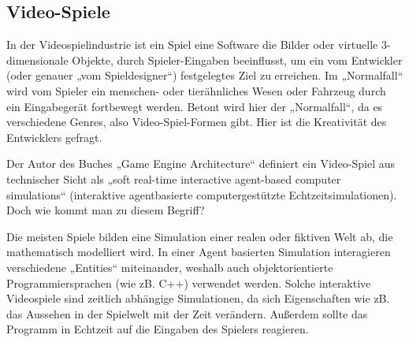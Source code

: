 \subsection{Video-Spiele}

In der Videospielindustrie ist ein Spiel eine Software die Bilder oder virtuelle 3-dimensionale Objekte, durch Spieler-Eingaben beeinflusst, um ein vom Entwickler (oder genauer „vom Spieldesigner“) festgelegtes Ziel zu erreichen. 
Im „Normalfall“ wird vom Spieler ein menschen- oder tierähnliches Wesen oder Fahrzeug durch ein Eingabegerät fortbewegt werden. Betont wird hier der „Normalfall“, da es verschiedene Genres, also Video-Spiel-Formen gibt. Hier ist die Kreativität des Entwicklers gefragt.

Der Autor des Buches „Game Engine Architecture“ \cite{gea} definiert ein Video-Spiel aus technischer Sicht als „soft real-time interactive agent-based computer simulations“ (interaktive agentbasierte computergestützte Echtzeitsimulationen).
Doch wie kommt man zu diesem Begriff?

Die meisten Spiele bilden eine Simulation einer realen oder fiktiven Welt ab, die mathematisch modelliert wird. In einer Agent basierten Simulation interagieren verschiedene „Entities“ miteinander, weshalb auch objektorientierte Programmiersprachen (wie zB. C++) verwendet werden.
Solche interaktive Videospiele sind zeitlich abhängige Simulationen, da sich Eigenschaften wie zB. das Aussehen in der Spielwelt mit der Zeit verändern. Außerdem sollte das Programm in Echtzeit auf die Eingaben des Spielers reagieren.
